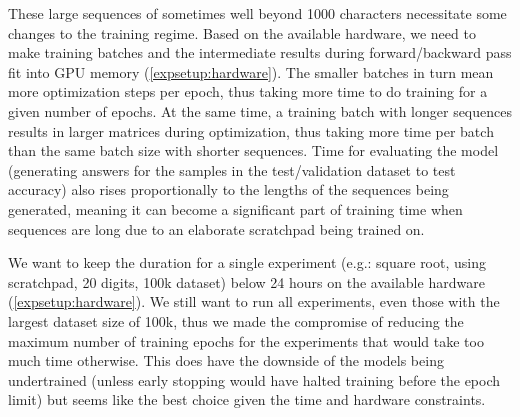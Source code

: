 These large sequences of sometimes well beyond 1000 characters necessitate some changes to the training regime. Based on the available hardware, we need to make training batches and the intermediate results during forward/backward pass fit into GPU memory (\cref{expsetup:hardware}). The smaller batches in turn mean more optimization steps per epoch, thus taking more time to do training for a given number of epochs. At the same time, a training batch with longer sequences results in larger matrices during optimization, thus taking more time per batch than the same batch size with shorter sequences.
Time for evaluating the model (generating answers for the samples in the test/validation dataset to test accuracy) also rises proportionally to the lengths of the sequences being generated, meaning it can become a significant part of training time when sequences are long due to an elaborate scratchpad being trained on.

We want to keep the duration for a single experiment (e.g.: square root, using scratchpad, 20 digits, 100k dataset) below 24 hours on the available hardware (\cref{expsetup:hardware}).
We still want to run all experiments, even those with the largest dataset size of 100k, thus we made the compromise of reducing the maximum number of training epochs for the experiments that would take too much time otherwise. This does have the downside of the models being undertrained (unless early stopping would have halted training before the epoch limit) but seems like the best choice given the time and hardware constraints.

